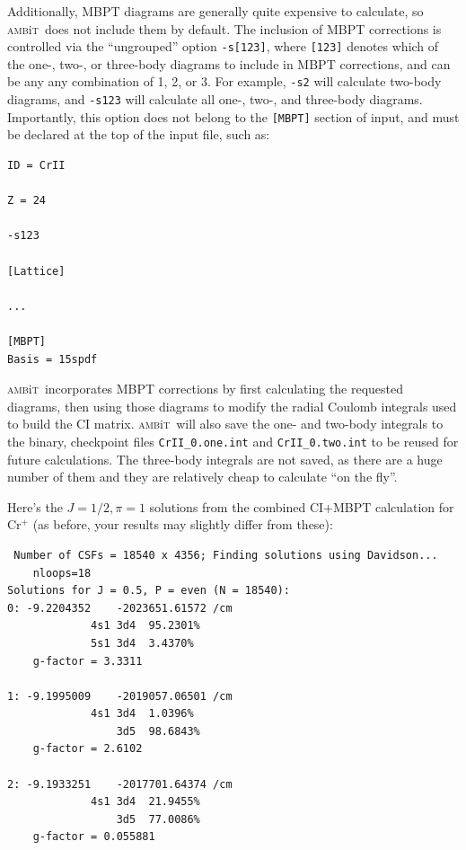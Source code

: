 \documentclass{report}
\newcommand{\ambit}{\textsc{amb}{\footnotesize i}\textsc{t}}
\begin{document}
Additionally, MBPT diagrams are generally quite expensive to calculate, so \ambit\  does not include them
by default. The inclusion of MBPT corrections is controlled via the ``ungrouped'' option
\texttt{-s[123]}, where \texttt{[123]} denotes which of the one-, two-, or three-body diagrams to 
include in MBPT corrections, and can be any any combination of 1, 2, or 3. For example, \texttt{-s2} 
will calculate two-body diagrams, and \texttt{-s123} will calculate all one-, two-, and three-body 
diagrams. Importantly, this option does not belong to the \texttt{[MBPT]} section of input, and must be
declared at the top of the input file, such as:

\begin{verbatim}
ID = CrII

Z = 24

-s123

[Lattice]

...

[MBPT]
Basis = 15spdf
\end{verbatim}

\ambit\  incorporates MBPT corrections by first calculating the requested diagrams, then using those
diagrams to modify the radial Coulomb integrals used to build the CI matrix. \ambit\  will also save the
one- and two-body integrals to the binary, checkpoint files \texttt{CrII\_0.one.int} and
\texttt{CrII\_0.two.int} to be reused for future calculations. The three-body integrals are not saved,
as there are a huge number of them and they are relatively cheap to calculate ``on the fly''.

Here's the $J = 1/2, \pi = 1$ solutions from the combined CI+MBPT calculation for Cr$^+$ (as before, 
your results may slightly differ from these):

\begin{verbatim}
 Number of CSFs = 18540 x 4356; Finding solutions using Davidson...
    nloops=18
Solutions for J = 0.5, P = even (N = 18540):
0: -9.2204352    -2023651.61572 /cm
             4s1 3d4  95.2301%
             5s1 3d4  3.4370%
    g-factor = 3.3311

1: -9.1995009    -2019057.06501 /cm
             4s1 3d4  1.0396%
                 3d5  98.6843%
    g-factor = 2.6102

2: -9.1933251    -2017701.64374 /cm
             4s1 3d4  21.9455%
                 3d5  77.0086%
    g-factor = 0.055881
\end{verbatim}
\end{document}
